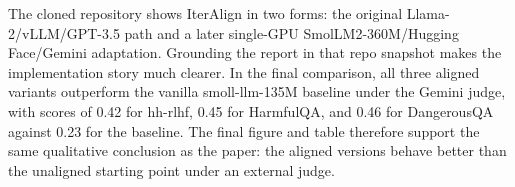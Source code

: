 \documentclass[11pt]{article}
\begin{document}
The cloned repository shows IterAlign in two forms: the original Llama-2/vLLM/GPT-3.5 path and a later single-GPU SmolLM2-360M/Hugging Face/Gemini adaptation. Grounding the report in that repo snapshot makes the implementation story much clearer. In the final comparison, all three aligned variants outperform the vanilla smoll-llm-135M baseline under the Gemini judge, with scores of 0.42 for hh-rlhf, 0.45 for HarmfulQA, and 0.46 for DangerousQA against 0.23 for the baseline. The final figure and table therefore support the same qualitative conclusion as the paper: the aligned versions behave better than the unaligned starting point under an external judge.



\end{document}
